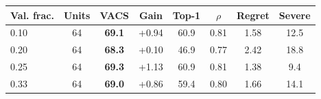 \begin{tabular}{lccccccc}
\toprule
Val. frac. & Units & VACS & Gain & Top-1 & $\rho$ & Regret & Severe \\
\midrule
0.10 & 64 & \textbf{69.1} & +0.94 & 60.9 & 0.81 & 1.58 & 12.5 \\
0.20 & 64 & \textbf{68.3} & +0.10 & 46.9 & 0.77 & 2.42 & 18.8 \\
0.25 & 64 & \textbf{69.3} & +1.13 & 60.9 & 0.81 & 1.38 & 9.4 \\
0.33 & 64 & \textbf{69.0} & +0.86 & 59.4 & 0.80 & 1.66 & 14.1 \\
\bottomrule
\end{tabular}
